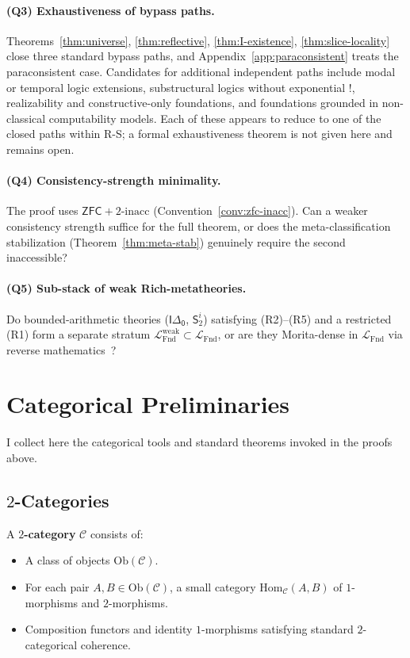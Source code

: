 \documentclass[11pt]{article}
\theoremstyle{plain}
\theoremstyle{definition}
\newcommand{\cC}{\mathcal{C}}
\newcommand{\LFnd}{\mathcal{L}_{\mathrm{Fnd}}}
\newcommand{\Ob}{\mathrm{Ob}}
\newcommand{\Hom}{\mathrm{Hom}}
\newcommand{\ZFC}{\mathsf{ZFC}}
\begin{document}
\paragraph{(Q3) Exhaustiveness of bypass paths.} Theorems~\ref{thm:universe}, \ref{thm:reflective}, \ref{thm:I-existence}, \ref{thm:slice-locality} close three standard bypass paths, and Appendix~\ref{app:paraconsistent} treats the paraconsistent case. Candidates for additional independent paths include modal or temporal logic extensions, substructural logics without exponential $!$, realizability and constructive-only foundations, and foundations grounded in non-classical computability models. Each of these appears to reduce to one of the closed paths within R-S; a formal exhaustiveness theorem is not given here and remains open.

\paragraph{(Q4) Consistency-strength minimality.} The proof uses $\ZFC + 2\text{-inacc}$ (Convention~\ref{conv:zfc-inacc}). Can a weaker consistency strength suffice for the full theorem, or does the meta-classification stabilization (Theorem~\ref{thm:meta-stab}) genuinely require the second inaccessible?

\paragraph{(Q5) Sub-stack of weak Rich-metatheories.} Do bounded-arithmetic theories ($\mathsf{I\Delta_0}$, $\mathsf{S}_2^i$) satisfying (R2)--(R5) and a restricted (R1) form a separate stratum $\LFnd^{\mathrm{weak}} \subset \LFnd$, or are they Morita-dense in $\LFnd$ via reverse mathematics~\cite{Simpson2009}?

\appendix

\section{Categorical Preliminaries}\label{app:categorical}

I collect here the categorical tools and standard theorems invoked in the proofs above.

\subsection{\texorpdfstring{$2$-Categories}{2-Categories}}

A \textbf{$2$-category} $\cC$ consists of:
\begin{itemize}
\item A class of objects $\Ob(\cC)$.
\item For each pair $A, B \in \Ob(\cC)$, a small category $\Hom_\cC(A, B)$ of $1$-morphisms and $2$-morphisms.
\item Composition functors and identity $1$-morphisms satisfying standard $2$-categorical coherence.
\end{itemize}
\end{document}
